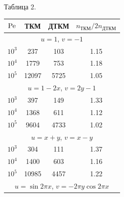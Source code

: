  


\hspace{9.1cm} Таблица 2. 


\begin{center}


\begin{tabular}{|c|c|c|c|} 


\hline 


$\operatorname{Pe}$ & ТКМ & ДТКМ & $n_{\text{ТКМ}}/2n_{\text{ДТКМ}}$ \\


\hline 


\multicolumn{4}{|c|}{$u=1$, $v=-1$}\\


\hline


$10^3$ & 237 & 103 & 1.15 \\


\hline


$10^4$ & 1779 & 753 & 1.18 \\


\hline


$10^5$ & 12097 & 5725 & 1.05 \\


\hline


\multicolumn{4}{|c|}{$u=1-2x$, $v=2y-1$}\\


\hline


$10^3$ & 397 & 149 & 1.33 \\


\hline


$10^4$ & 1368 & 611 & 1.12 \\


\hline


$10^5$ & 9604 & 4733 & 1.02 \\


\hline


\multicolumn{4}{|c|}{$u=x+y$, $v=x-y$}\\


\hline


$10^3$ & 304 & 111 & 1.37 \\


\hline


$10^4$ & 1400 & 603 & 1.16 \\


\hline


$10^5$ & 10985 & 4457 & 1.22 \\


\hline


\multicolumn{4}{|c|}{$u=\sin 2\pi x$, $v=-2\pi y\cos 2\pi x$}\\



\end{tabular}
\end{center}
